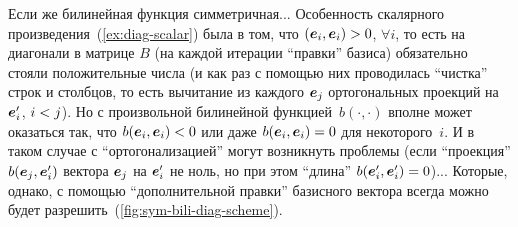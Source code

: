 \documentclass[a4paper,12pt]{article}
\begin{document}
  Если же билинейная функция симметричная...
  Особенность скалярного произведения~(\ref{ex:diag-scalar}) была в том, что $(\bds e_i, \bds e_i) \hm> 0$, $\forall i$, то есть на диагонали в матрице $B$ (на каждой итерации ``правки'' базиса) обязательно стояли положительные числа (и как раз с помощью них проводилась ``чистка'' строк и столбцов, то есть вычитание из каждого $\boldsymbol e_j$ ортогональных проекций на $\boldsymbol e'_i$, $i \hm< j$).
  Но с произвольной билинейной функцией~$b(\cdot, \cdot)$ вполне может оказаться так, что $b(\bds e_i, \bds e_i) \hm< 0$ или даже $b(\bds e_i, \bds e_i) \hm= 0$ для некоторого~$i$.
  И в таком случае с ``ортогонализацией'' могут возникнуть проблемы (если ``проекция'' $b(\boldsymbol e_j, \boldsymbol e_i')$ вектора $\boldsymbol e_j$ на $\boldsymbol e_i'$ не ноль, но при этом ``длина'' $b(\bds e_i', \bds e_i') \hm= 0$)...
  Которые, однако, с помощью ``дополнительной правки'' базисного вектора всегда можно будет разрешить~(\ref{fig:sym-bili-diag-scheme}).
  
\end{document}
